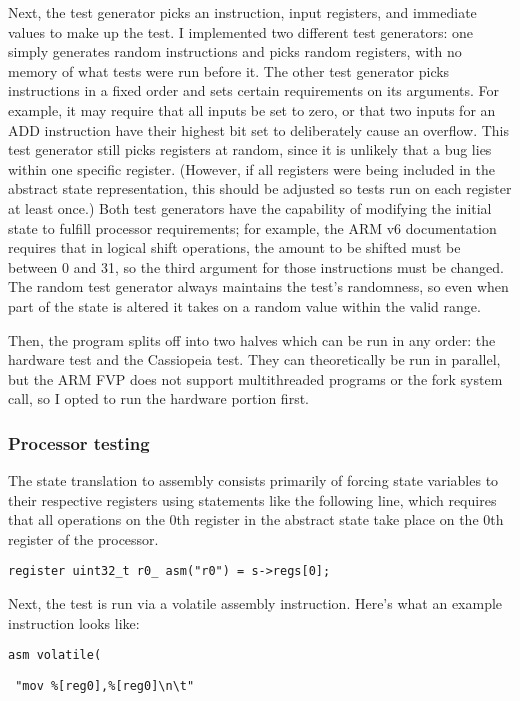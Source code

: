 \documentclass[letterpaper,12pt]{article}
\begin{document}
Next, the test generator picks an instruction, input registers, and immediate values to make up the test. I implemented two different test generators: one simply generates random instructions and picks random registers, with no memory of what tests were run before it. The other test generator picks instructions in a fixed order and sets certain requirements on its arguments. For example, it may require that all inputs be set to zero, or that two inputs for an ADD instruction have their highest bit set to deliberately cause an overflow. This test generator still picks registers at random, since it is unlikely that a bug lies within one specific register. (However, if all registers were being included in the abstract state representation, this should be adjusted so tests run on each register at least once.) Both test generators have the capability of modifying the initial state to fulfill processor requirements; for example, the ARM v6 documentation requires that in logical shift operations, the amount to be shifted must be between 0 and 31, so the third argument for those instructions must be changed. The random test generator always maintains the test's randomness, so even when part of the state is altered it takes on a random value within the valid range.

Then, the program splits off into two halves which can be run in any order: the hardware test and the Cassiopeia test. They can theoretically be run in parallel, but the ARM FVP does not support multithreaded programs or the fork system call, so I opted to run the hardware portion first. 

\subsubsection{Processor testing}

The state translation to assembly consists primarily of forcing state variables to their respective registers using statements like the following line, which requires that all operations on the 0th register in the abstract state take place on the 0th register of the processor.

\texttt{register uint32\_t r0\_ asm("r0") = s->regs[0];}

Next, the test is run via a volatile assembly instruction. Here's what an example instruction looks like:

\texttt{asm volatile(}

\texttt{\ "mov \%[reg0],\%[reg0]\textbackslash n\textbackslash t"}
\end{document}

